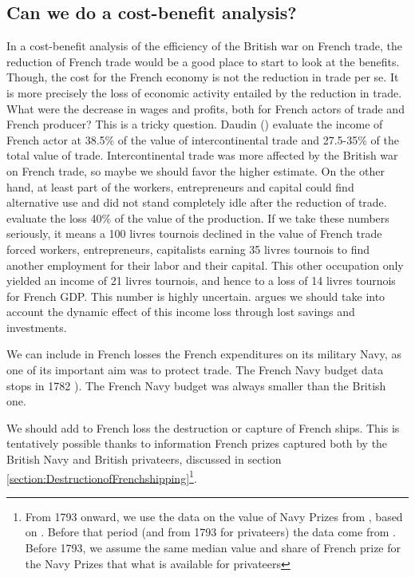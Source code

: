 \documentclass[12pt,a4paper,notitlepage,english]{article}
\begin{document}
\subsection{Can we do a cost-benefit analysis?}
In a cost-benefit analysis of the efficiency of the British war on French trade, the reduction of French trade would be a good place to start to look at the benefits. Though, the cost for the French economy is not the reduction in trade per se. It is more precisely the loss of economic activity entailed by the reduction in trade. What were the decrease in wages and profits, both for French actors of trade and French producer? This is a tricky question. Daudin (\cite[p. 408]{Daudin2005}) evaluate the income of French actor at 38.5\% of the value of intercontinental trade and 27.5-35\% of the total value of trade. Intercontinental trade was more affected by the British war on French trade, so maybe we should favor the higher estimate. On the other hand, at least part of the workers, entrepreneurs and capital could find alternative use and did not stand completely idle after the reduction of trade. \cite[p. 421]{Daudin2005} evaluate the loss 40\% of the value of the production. If we take these numbers seriously, it means a 100 livres tournois declined in the value of French trade forced workers, entrepreneurs, capitalists earning 35 livres tournois to find another employment for their labor and their capital. This other occupation only yielded an income of 21 livres tournois, and hence to a loss of 14 livres tournois for French GDP. This number is highly uncertain. \cite{Daudin2005} argues we should take into account the dynamic effect of this income loss through lost savings and investments.

We can include in French losses the French expenditures on its military Navy, as one of its important aim was to protect trade.  The French Navy budget data stops in 1782 \cite{Acerra1997, Villiers1997,Petitfils2015}). The French Navy budget was always smaller than the British one.

We should add to French loss the destruction or capture of French ships. This is tentatively possible thanks to information French prizes captured both by the British Navy and British privateers, discussed in section \ref{section:DestructionofFrenchshipping}\footnote{From 1793 onward, we use the data on the value of Navy Prizes from \cite{Benjamin2009}, based on \cite{Hill1998}. Before that period (and from 1793 for privateers) the data come from \cite{Starkey1990,Hillmann2011}. Before 1793, we assume the same median value and share of French prize for the Navy Prizes that what is available for privateers }. 
\end{document}
